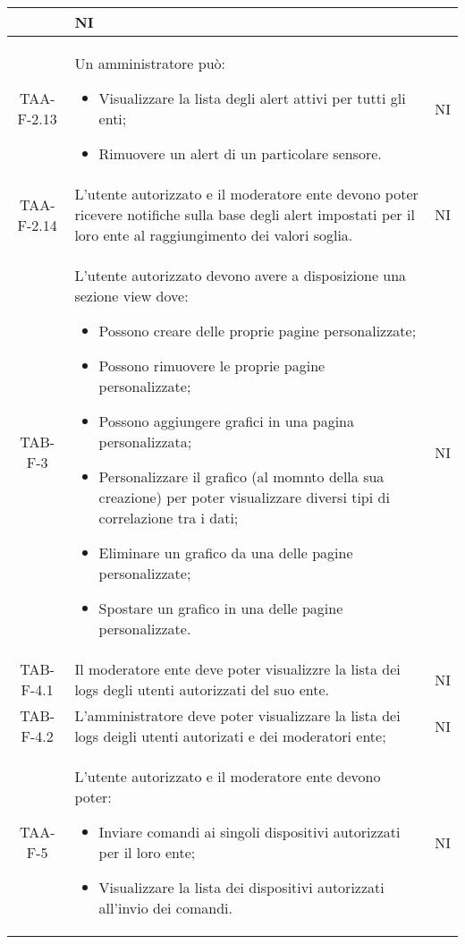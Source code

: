 \begin{center}
\begin{longtable}{|c|p{10cm}|c|}
\begin{itemize}
			 \end{itemize} & NI \\
			 \hline
			 TAA-F-2.13 & Un amministratore può:
			  \begin{itemize}
			  	\item Visualizzare la lista degli alert attivi per tutti gli enti;
			  	\item Rimuovere un alert di un particolare sensore.
			  \end{itemize} & NI \\
			  \hline
			  TAA-F-2.14 & L'utente autorizzato e il moderatore ente devono poter ricevere notifiche sulla base degli alert impostati per il loro ente al raggiungimento dei valori soglia. & NI \\
			  \hline
			  TAB-F-3 & L'utente autorizzato devono avere a disposizione una sezione view dove:
			  \begin{itemize}
			  	\item Possono creare delle proprie pagine personalizzate;
			  	\item Possono rimuovere le proprie pagine personalizzate;
			  	\item Possono aggiungere grafici in una pagina personalizzata;
			  	\item Personalizzare il grafico (al momnto della sua creazione) per poter visualizzare diversi tipi di correlazione tra i dati;
			  	\item Eliminare un grafico da una delle pagine personalizzate;
			  	\item Spostare un grafico in una delle pagine personalizzate. 
			  \end{itemize} & NI \\
			  \hline
			  TAB-F-4.1 & Il moderatore ente deve poter visualizzre la lista dei logs degli utenti autorizzati del suo ente. & NI \\
			  \hline
			  TAB-F-4.2 & L'amministratore deve poter visualizzare la lista dei logs deigli utenti autorizati e dei moderatori ente; & NI \\
			  \hline
			  TAA-F-5 & L'utente autorizzato e il moderatore ente devono poter:
			  \begin{itemize}
			  	\item Inviare comandi ai singoli dispositivi autorizzati per il loro ente;
			  	\item Visualizzare la lista dei dispositivi autorizzati all'invio dei comandi.
			  \end{itemize} & NI \\

\end{longtable}
\end{center}

